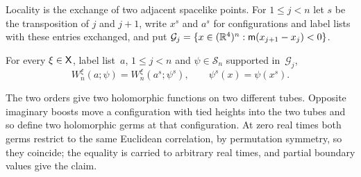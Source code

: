 Locality is the exchange of two adjacent spacelike points. For $1\le j<n$ let $s$ be the transposition of $j$ and $j+1$, write $x^s$ and $a^s$ for configurations and label lists with these entries exchanged, and put $\mathcal G_j=\{x\in(\mathbb{R}^4)^n:\mathsf{m}(x_{j+1}-x_j)<0\}$.
\begin{lemma}\label{lem:H-locality}
For every $\xi\in\mathsf{X}$, label list~$a$, $1\le j<n$ and $\psi\in\mathcal S_n$ supported in~$\mathcal G_j$,
\begin{equation*}
W^\xi_n(a;\psi)=W^\xi_n(a^s;\psi^s),\qquad \psi^s(x)=\psi(x^s).
\end{equation*}
\end{lemma}
The two orders give two holomorphic functions on two different tubes. Opposite imaginary boosts move a configuration with tied heights into the two tubes and so define two holomorphic germs at that configuration. At zero real times both germs restrict to the same Euclidean correlation, by permutation symmetry, so they coincide; the equality is carried to arbitrary real times, and partial boundary values give the claim.
